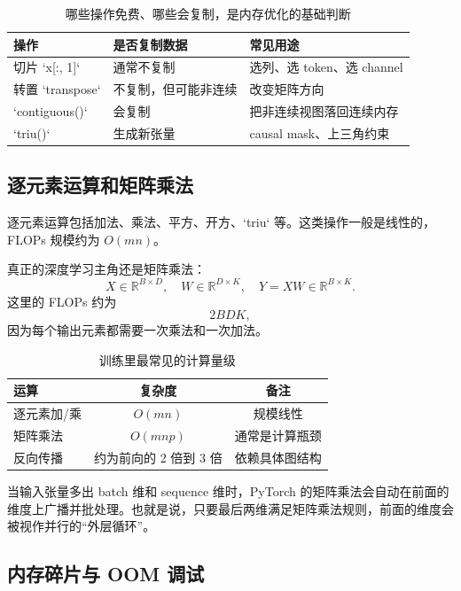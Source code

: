 \begin{table}[H]
\centering
\begin{tabular}{p{}p{}p{}}
\toprule
\textbf{操作} & \textbf{是否复制数据} & \textbf{常见用途} \\
\midrule
切片 `x[:, 1]` & 通常不复制 & 选列、选 token、选 channel \\
转置 `transpose` & 不复制，但可能非连续 & 改变矩阵方向 \\
`contiguous()` & 会复制 & 把非连续视图落回连续内存 \\
`triu()` & 生成新张量 & causal mask、上三角约束 \\
\bottomrule
\end{tabular}
\caption{哪些操作免费、哪些会复制，是内存优化的基础判断}
\end{table}

\subsection{逐元素运算和矩阵乘法}

逐元素运算包括加法、乘法、平方、开方、`triu` 等。这类操作一般是线性的，FLOPs 规模约为 \(O(mn)\)。

真正的深度学习主角还是矩阵乘法：
\[
X \in \mathbb{R}^{B\times D}, \quad W \in \mathbb{R}^{D\times K}, \quad Y = XW \in \mathbb{R}^{B\times K}.
\]
这里的 FLOPs 约为
\[
2BDK,
\]
因为每个输出元素都需要一次乘法和一次加法。

\begin{table}[H]
\centering
\begin{tabular}{lcc}
\toprule
\textbf{运算} & \textbf{复杂度} & \textbf{备注} \\
\midrule
逐元素加/乘 & \(O(mn)\) & 规模线性 \\
矩阵乘法 & \(O(mnp)\) & 通常是计算瓶颈 \\
反向传播 & 约为前向的 2 倍到 3 倍 & 依赖具体图结构 \\
\bottomrule
\end{tabular}
\caption{训练里最常见的计算量级}
\end{table}

当输入张量多出 batch 维和 sequence 维时，PyTorch 的矩阵乘法会自动在前面的维度上广播并批处理。也就是说，只要最后两维满足矩阵乘法规则，前面的维度会被视作并行的“外层循环”。

\subsection{内存碎片与 OOM 调试}

